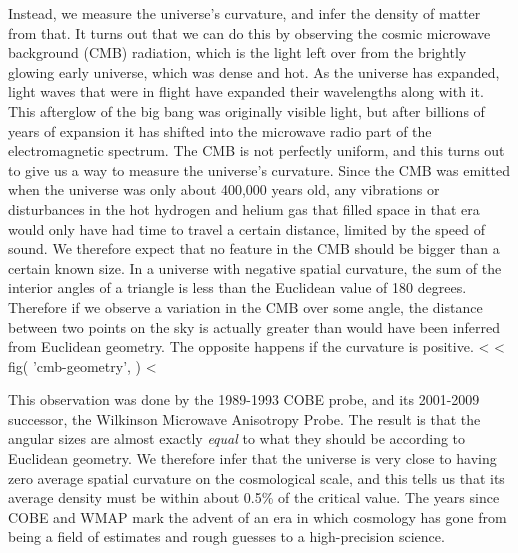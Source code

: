 Instead, we measure the universe's curvature, and infer the density of matter from that. It turns out that we can do this by
observing the cosmic microwave background (CMB) radiation, which is the light left over
from the brightly glowing early universe, which was dense and hot. As the universe has expanded, light waves that were in flight
have expanded their wavelengths along with it. This afterglow of the big bang was originally visible light, but after billions of
years of expansion it has shifted into the microwave radio part of the electromagnetic spectrum. The CMB is not perfectly uniform,
and this turns out to give us a way to measure the universe's curvature. Since the CMB was emitted when the universe was only about
400,000 years old, any vibrations or disturbances in the hot hydrogen and helium gas that filled space in that era would only have
had time to travel a certain distance, limited by the speed of sound. We therefore expect that no feature in the CMB should be bigger
than a certain known size.
In a universe with negative spatial
curvature, the sum of the interior angles of a triangle is less than the Euclidean value of 180 degrees.
Therefore if we observe a variation in the CMB over some angle, the distance between two points on
the sky is actually greater than would have been inferred from Euclidean geometry. The opposite happens if the
curvature is positive.
<%
<%
  fig(
    'cmb-geometry',
  )
<%

This observation was done by the 1989-1993 COBE probe, and its 2001-2009 successor, the Wilkinson Microwave Anisotropy Probe.
The result is that the angular sizes are almost exactly \emph{equal} to what they should be
according to Euclidean geometry. We therefore infer that the 
universe is very close to having zero average spatial curvature on the cosmological scale, and this tells
us that its average density must be within about 0.5\%
of the critical value. The years since COBE and WMAP mark the advent of an era in which cosmology has gone from being
a field of estimates and rough guesses to a high-precision science.

